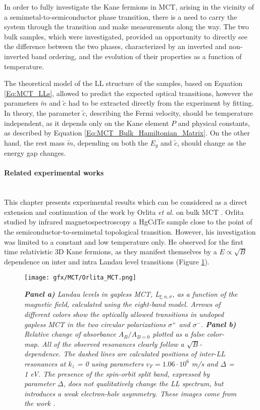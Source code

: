 \documentclass[titlepage,a4paper]{book}
\newcommand{\wciecie}{\quad\phantom{v}}
\newcommand{\myparagraph}[1]{\paragraph{#1}\mbox{}\\}
\begin{document}
In order to fully investigate the Kane fermions in MCT, arising in the vicinity of a semimetal-to-semiconductor phase transition, there is a need to carry the system through the transition and make measurements along the way. The two bulk samples, which were investigated, provided an opportunity to directly see the difference between the two phases, characterized by an inverted and non-inverted band ordering, and the evolution of their properties as a function of temperature.  

The theoretical model of the LL structure of the samples, based on Equation \ref{Eq:MCT_LLs}, allowed to predict the expected optical transitions, however the parameters $\tilde{m}$ and $\tilde c$ had to be extracted directly from the experiment by fitting. In theory, the parameter $\tilde c$, describing the Fermi velocity, should be temperature independent, as it depends only on the Kane element $P$ and physical constants, as described by     
Equation \ref{Eq:MCT_Bulk_Hamiltonian_Matrix}. On the other hand, the rest mass $\tilde{m}$, depending on both the $E_g$ and $\tilde{c}$, should change as the energy gap changes.

\myparagraph{Related experimental works}
\wciecie
This chapter presents experimental results which can be considered as a direct extension and continuation of the work by Orlita \textit{et al.} on bulk MCT \cite{Orlita_MCT}. Orlita studied by infrared magnetospectroscopy a HgCdTe sample close to the point of the semiconductor-to-semimetal topological transition. However, his investigation was limited to a constant and low temperature only. He observed for the first time relativistic 3D Kane fermions, as they manifest themselves by a $E \propto \sqrt{B}$ dependence on inter and intra Landau level transitions (Figure \ref{fig:Orlita_MCT}). 

\begin{figure}[ht]
	\centering
	\texttt{[image: gfx/MCT/Orlita\_MCT.png]}
	\vspace{-10pt}
	\caption{\textit{\textbf{Panel a)} Landau levels in gapless MCT, L$_{\xi,n,\sigma}$, as a function of the magnetic field, calculated using the eight-band model. Arrows of different colors show the optically allowed transitions in undoped gapless MCT in the two circular polarizations $\sigma^{+}$ and $\sigma^{-}$. \textbf{Panel b)} Relative change of absorbance $A_B/A_{B=0}$ plotted as a false color-map. All of the observed resonances clearly follow a $\sqrt{B}$-dependence. The dashed lines are calculated positions of inter-LL resonances at $k_z$ = 0 using parameters $v_F = 1.06 \cdot 10^6$ m/s and $\Delta$ = 1 eV. The presence of the spin-orbit split band, expressed by parameter $\Delta$, does not qualitatively change the LL spectrum, but introduces a weak electron-hole asymmetry. These images come from the work \cite{Orlita_MCT}.}}
	\label{fig:Orlita_MCT}
\end{figure}
\end{document}

